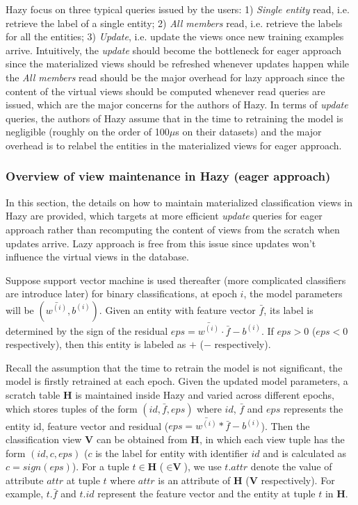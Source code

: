 Hazy focus on three typical queries issued by the users: 1) {\em Single entity} read, i.e. retrieve the label of a single entity; 2) {\em All members} read, i.e. retrieve the labels for all the entities; 3) {\em Update}, i.e. update the views once new training examples arrive. Intuitively, the {\em update} should become the bottleneck for eager approach since the materialized views should be refreshed whenever updates happen while the {\em All members} read should be the major overhead for lazy approach since the content of the virtual views should be computed whenever read queries are issued, which are the major concerns for the authors of Hazy. In terms of {\em update} queries, the authors of Hazy assume that in the time to retraining the model is negligible (roughly on the order of 100$\mu$s on their datasets) and the major overhead is to relabel the entities in the materialized views for eager approach. 

\subsubsection{Overview of view maintenance in Hazy (eager approach)}
In this section, the details on how to maintain materialized classification views in Hazy are provided, which targets at more efficient {\em update} queries for eager approach rather than recomputing the content of views from the scratch when updates arrive. Lazy approach is free from this issue since updates won't influence the virtual views in the database. 

Suppose support vector machine is used thereafter (more complicated classifiers are introduce later) for binary classifications, at epoch $i$, the model parameters will be $(\bar{w^{(i)}}, b^{(i)})$. Given an entity with feature vector $\bar{f}$, its label is determined by the sign of the residual $eps = \bar{w^{(i)}}\cdot\bar{f}-b^{(i)}$. If $eps > 0$ ($eps < 0$ respectively), then this entity is labeled as $+$ ($-$ respectively).

Recall the assumption that the time to retrain the model is not significant, the model is firstly retrained at each epoch. Given the updated model parameters, a scratch table $\textbf{H}$ is maintained inside Hazy and varied across different epochs, which stores tuples of the form $(id, \bar{f}, eps)$ where $id$, $\bar{f}$ and $eps$ represents the entity id, feature vector and residual ($eps = \bar{w^{(i)}}*\bar{f}-b^{(i)}$). Then the classification view $\textbf{V}$ can be obtained from $\textbf{H}$, in which each view tuple has the form $(id, c, eps)$ ($c$ is the label for entity with identifier $id$ and is calculated as $c=sign(eps)$). For a tuple $t \in \textbf{H}$ ($\in \textbf{V}$), we use $t.attr$ denote the value of attribute $attr$ at tuple $t$ where $attr$ is an attribute of $\textbf{H}$ ($\textbf{V}$ respectively). For example, $t.\bar{f}$ and $t.id$ represent the feature vector and the entity at tuple $t$ in $\textbf{H}$.

